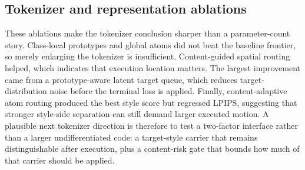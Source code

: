 \documentclass[letterpaper]{article}
\begin{document}
\subsection{Tokenizer and representation ablations}
\begin{table}[t]
\centering
\caption{Distinct5-512 tokenizer and representation ablations. The results show that capacity alone is not the issue; target selection, content-guided execution, and sparse routing determine whether the representation is executable.}
\label{tab:tokenizer}
\small
\setlength{\tabcolsep}{4pt}
\end{table}

These ablations make the tokenizer conclusion sharper than a parameter-count story. Class-local prototypes and global atoms did not beat the baseline frontier, so merely enlarging the tokenizer is insufficient. Content-guided spatial routing helped, which indicates that execution location matters. The largest improvement came from a prototype-aware latent target queue, which reduces target-distribution noise before the terminal loss is applied. Finally, content-adaptive atom routing produced the best style score but regressed LPIPS, suggesting that stronger style-side separation can still demand larger executed motion. A plausible next tokenizer direction is therefore to test a two-factor interface rather than a larger undifferentiated code: a target-style carrier that remains distinguishable after execution, plus a content-risk gate that bounds how much of that carrier should be applied.
\end{document}
